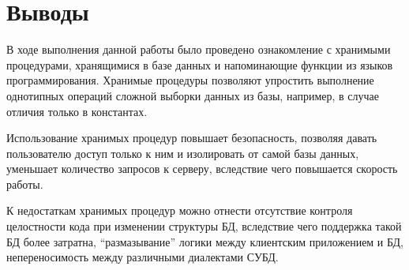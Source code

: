 \section{Выводы}

В ходе выполнения данной работы было проведено ознакомление с хранимыми процедурами, хранящимися в базе данных и напоминающие функции из языков программирования. Хранимые процедуры позволяют упростить выполнение однотипных операций сложной выборки данных из базы, например, в случае отличия только в константах.

Использование хранимых процедур повышает безопасность, позволяя давать пользователю доступ только к ним и изолировать от самой базы данных, уменьшает количество запросов к серверу, вследствие чего повышается скорость работы. 

К недостаткам хранимых процедур можно отнести отсутствие контроля целостности кода при изменении структуры БД, вследствие чего поддержка такой БД более затратна, "`размазывание"' логики между клиентским приложением и БД, непереносимость между различными диалектами СУБД.